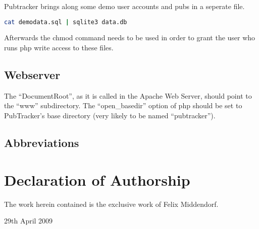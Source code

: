 \documentclass[a4paper,10pt]{scrartcl}
\begin{document}
Pubtracker brings along some demo user accounts and pubs in a seperate file.

\begin{lstlisting}[language=bash]
cat demodata.sql | sqlite3 data.db
\end{lstlisting}

Afterwards the chmod command needs to be used in order to grant the user who
runs php write access to these files.

\subsection{Webserver}
The ``DocumentRoot'', as it is called in the Apache Web Server, should point to
the ``www'' subdirectory. The ``open\_basedir'' option of php should be set to
PubTracker's base directory (very likely to be named ``pubtracker'').

\begin{appendix}
\clearpage
{}
{}



\section{Abbreviations}
\begin{acronym}[XHTML-MP]
\end{acronym}
\end{appendix}

\section{Declaration of Authorship}
The work herein contained is the exclusive work of Felix Middendorf.

29th April 2009
\end{document}
